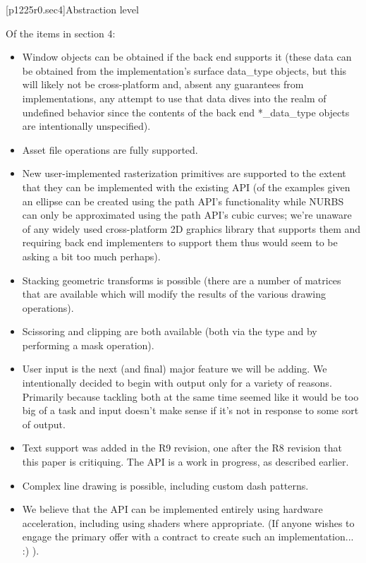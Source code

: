 [p1225r0.sec4]{Abstraction level}

\pnum
Of the items in section 4:

\begin{itemize}
\item Window objects can be obtained if the back end supports it (these data can be obtained from the implementation's surface data_type objects, but this will likely not be cross-platform and, absent any guarantees from implementations, any attempt to use that data dives into the realm of undefined behavior since the contents of the back end *_data_type objects are intentionally unspecified).
\item Asset file operations are fully supported.
\item New user-implemented rasterization primitives are supported to the extent that they can be implemented with the existing API (of the examples given an ellipse can be created using the path API's  functionality while NURBS can only be approximated using the path API's cubic \bezierlocal{} curves; we're unaware of any widely used cross-platform 2D graphics library that supports them and requiring back end implementers to support them thus would seem to be asking a bit too much perhaps).
\item Stacking geometric transforms is possible (there are a number of matrices that are available which will modify the results of the various drawing operations).
\item Scissoring and clipping are both available (both via the  type and by performing a mask operation).
\item User input is the next (and final) major feature we will be adding. We intentionally decided to begin with output only for a variety of reasons. Primarily because tackling both at the same time seemed like it would be too big of a task and input doesn't make sense if it's not in response to some sort of output.\item Text support was added in the R9 revision, one after the R8 revision that this paper is critiquing. The API is a work in progress, as described earlier.
\item Complex line drawing is possible, including custom dash patterns.
\item We believe that the API can be implemented entirely using hardware acceleration, including using shaders where appropriate. (If anyone wishes to engage the primary offer with a contract to create such an implementation... :) ). 
\end{itemize}

